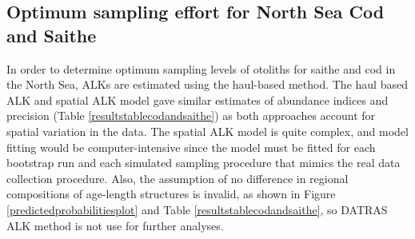 \documentclass[a4paper 12pt]{article}
\numberwithin{equation}{section}
\begin{document}
%
%


\subsection{Optimum sampling effort for North Sea Cod and Saithe}
\label{sec:optimumeffortresults}
In order to determine optimum sampling levels of otoliths for saithe and cod in the North Sea, ALKs are estimated using the haul-based  method.  The haul based ALK and spatial ALK model gave similar estimates of abundance indices and precision (Table \ref{resultstablecodandsaithe}) as both approaches account for spatial variation in the data. The spatial ALK model is  quite complex, and model fitting would be computer-intensive since the model must be fitted for each bootstrap run and each simulated sampling procedure that mimics the real data collection procedure. Also, the assumption of no difference in regional compositions of age-length structures is invalid,  as shown in Figure \ref{predictedprobabilitiesplot} and Table \ref{resultstablecodandsaithe},  so DATRAS ALK method is not use for further analyses.
\end{document}
